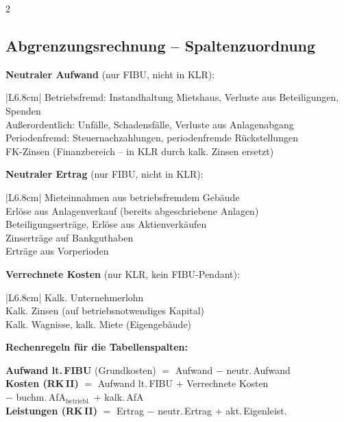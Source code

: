 \documentclass[10pt,a4paper]{article}
\begin{document}
\begin{multicols}{2}

\subsection{Abgrenzungsrechnung -- Spaltenzuordnung}

\textbf{Neutraler Aufwand} (nur FIBU, nicht in KLR):

\begin{tabular}{|L{6.8cm}|}
\hline
{}
Betriebsfremd: Instandhaltung Mietshaus, Verluste aus Beteiligungen, Spenden \\
\hline
Außerordentlich: Unfälle, Schadensfälle, Verluste aus Anlagenabgang \\
\hline
Periodenfremd: Steuernachzahlungen, periodenfremde Rückstellungen \\
\hline
FK-Zinsen (Finanzbereich -- in KLR durch kalk. Zinsen ersetzt) \\
\hline
\end{tabular}

\vspace{4pt}
\textbf{Neutraler Ertrag} (nur FIBU, nicht in KLR):

\begin{tabular}{|L{6.8cm}|}
\hline
{}
Mieteinnahmen aus betriebsfremdem Gebäude \\
\hline
Erlöse aus Anlagenverkauf (bereits abgeschriebene Anlagen) \\
\hline
Beteiligungserträge, Erlöse aus Aktienverkäufen \\
\hline
Zinserträge auf Bankguthaben \\
\hline
Erträge aus Vorperioden \\
\hline
\end{tabular}

\vspace{4pt}
\textbf{Verrechnete Kosten} (nur KLR, kein FIBU-Pendant):

\begin{tabular}{|L{6.8cm}|}
\hline
{}
Kalk. Unternehmerlohn \\
\hline
Kalk. Zinsen (auf betriebsnotwendiges Kapital) \\
\hline
Kalk. Wagnisse, kalk. Miete (Eigengebäude) \\
\hline
\end{tabular}

\vspace{4pt}
\textbf{Rechenregeln für die Tabellenspalten:}
\begin{formelbox}
\textbf{Aufwand lt.\,FIBU} (Grundkosten) $=$ Aufwand $-$ neutr.\,Aufwand\\[3pt]
\textbf{Kosten (RK\,II)} $=$ Aufwand lt.\,FIBU $+$ Verrechnete Kosten\\
\hspace*{1.5cm} $-$ buchm.\,AfA$_{\text{betriebl.}}$ $+$ kalk.\,AfA\\[3pt]
\textbf{Leistungen (RK\,II)} $=$ Ertrag $-$ neutr.\,Ertrag $+$ akt.\,Eigenleist.
\end{formelbox}


\end{multicols}
\end{document}
